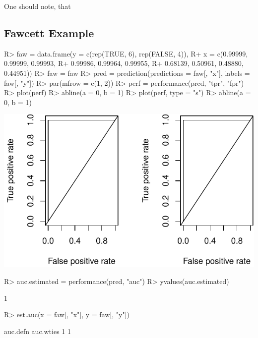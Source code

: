 \documentclass[article]{jss}
\begin{document}
One should note, that

\hypertarget{fawcett-example}{%
\subsection{Fawcett Example}\label{fawcett-example}}

\begin{CodeChunk}

\begin{CodeInput}
R> faw = data.frame(y = c(rep(TRUE, 6), rep(FALSE, 4)),
R+                  x = c(0.99999, 0.99999, 0.99993, 
R+                        0.99986, 0.99964, 0.99955, 
R+                        0.68139, 0.50961, 0.48880, 0.44951))
R> faw = faw %
R> pred = prediction(predictions = faw[, "x"], labels = faw[, "y"])
R> par(mfrow = c(1, 2))
R> perf = performance(pred, "tpr", "fpr")
R> plot(perf)
R> abline(a = 0, b = 1)
R> plot(perf, type = "s")
R> abline(a = 0, b = 1)
\end{CodeInput}


\begin{center}\includegraphics{index_files/figure-latex/fawcett-1} \end{center}


\begin{CodeInput}
R> auc.estimated = performance(pred, "auc")
R> yvalues(auc.estimated)
\end{CodeInput}

\begin{CodeOutput}
[1] 1
\end{CodeOutput}

\begin{CodeInput}
R> est.auc(x = faw[, "x"], y = faw[, "y"])
\end{CodeInput}

\begin{CodeOutput}
 auc.defn auc.wties 
        1         1 
\end{CodeOutput}
\end{CodeChunk}


\end{document}
